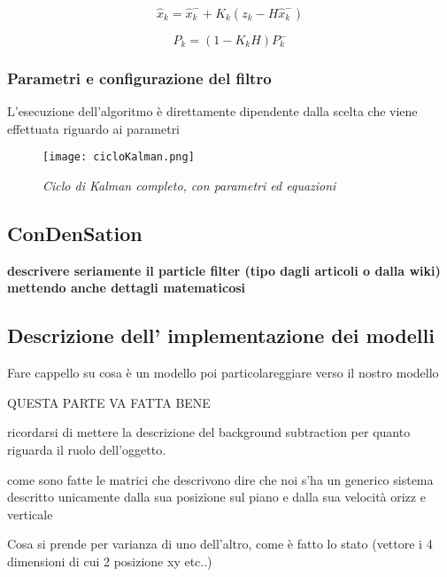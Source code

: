 \begin{equation}\label{eq:post}
\hat{x}_k=\hat{x}_k^-+K_k(z_k-H\hat{x}_k^-)
\end{equation} 

\begin{equation}\label{eq:P}
P_k=(1-K_kH)P_k^-
\end{equation} 

\subsubsection{Parametri e configurazione del filtro}
L'esecuzione dell'algoritmo è direttamente dipendente dalla scelta che viene effettuata riguardo ai parametri 
\begin{figure}[hb]
\centering
	\texttt{[image: cicloKalman.png]}
\caption{\textit{Ciclo di Kalman completo, con parametri ed equazioni}\label{fig:completeKalman}}
\end{figure}
\subsection{ConDenSation}\label{condensation}
\textbf{descrivere seriamente il particle filter (tipo dagli articoli o dalla wiki) mettendo anche dettagli matematicosi}

\subsection{Descrizione dell' implementazione dei modelli}
Fare cappello su cosa è un modello poi particolareggiare verso il nostro modello

QUESTA PARTE VA FATTA BENE

ricordarsi di mettere la descrizione del background subtraction per quanto riguarda il ruolo dell'oggetto.

come sono fatte le matrici che descrivono 
dire che noi s'ha un generico sistema descritto unicamente dalla sua posizione sul piano e dalla sua velocità orizz e verticale

Cosa si prende per varianza di uno dell'altro, come è fatto lo stato (vettore i 4 dimensioni di cui 2 posizione xy etc..)
